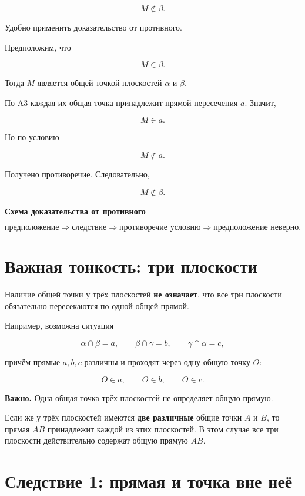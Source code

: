 \documentclass[a4paper,12pt]{article}
\newcommand{\warning}[1]{%
  \par\medskip
  {\color{darkaccent}\bfseries Важно.} #1
  \par\medskip
}
\newcommand{\method}[1]{%
  \par\smallskip
  {\bfseries\color{accent}#1}
  \par\smallskip
}
\begin{document}
\[
M\notin\beta.
\]

Удобно применить доказательство от противного.

Предположим, что

\[
M\in\beta.
\]

Тогда \(M\) является общей точкой плоскостей
\(\alpha\) и \(\beta\).

По A3 каждая их общая точка принадлежит прямой пересечения \(a\).
Значит,

\[
M\in a.
\]

Но по условию

\[
M\notin a.
\]

Получено противоречие. Следовательно,

\[
\boxed{M\notin\beta}.
\]

\method{Схема доказательства от противного}

\[
\text{предположение}
\Longrightarrow
\text{следствие}
\Longrightarrow
\text{противоречие условию}
\Longrightarrow
\text{предположение неверно}.
\]


\section{Важная тонкость: три плоскости}

Наличие общей точки у трёх плоскостей \textbf{не означает},
что все три плоскости обязательно пересекаются по одной общей прямой.

Например, возможна ситуация

\[
\alpha\cap\beta=a,
\qquad
\beta\cap\gamma=b,
\qquad
\gamma\cap\alpha=c,
\]

причём прямые \(a,b,c\) различны и проходят через одну общую точку \(O\):

\[
O\in a,\qquad O\in b,\qquad O\in c.
\]

\warning{
Одна общая точка трёх плоскостей не определяет общую прямую.
}

Если же у трёх плоскостей имеются \textbf{две различные}
общие точки \(A\) и \(B\), то прямая \(AB\) принадлежит
каждой из этих плоскостей. В этом случае все три плоскости
действительно содержат общую прямую \(AB\).


\section{Следствие 1: прямая и точка вне неё}
\end{document}

